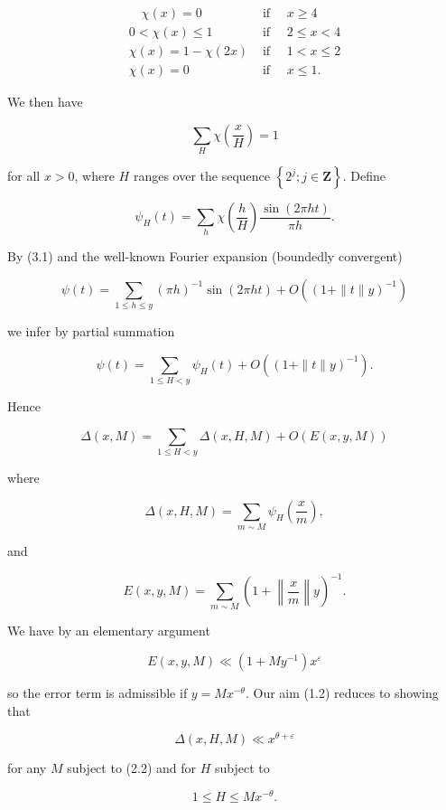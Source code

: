 \documentclass[10pt]{article}
\begin{document}
$$
\begin{aligned}
\quad \chi(x)=0 & \text { if } \quad x \geqslant 4 \\
0<\chi(x) \leqslant 1 & \text { if } \quad 2 \leqslant x<4 \\
\chi(x)=1-\chi(2 x) & \text { if } \quad 1<x \leqslant 2 \\
\chi(x)=0 & \text { if } \quad x \leqslant 1 .
\end{aligned}
$$

We then have


\begin{equation*}
\sum_{H} \chi\left(\frac{x}{H}\right)=1 \tag{3.1}
\end{equation*}


for all $x>0$, where $H$ ranges over the sequence $\left\{2^{j} ; j \in \mathbf{Z}\right\}$. Define

$$
\psi_{H}(t)=\sum_{h} \chi\left(\frac{h}{H}\right) \frac{\sin (2 \pi h t)}{\pi h} .
$$

By (3.1) and the well-known Fourier expansion (boundedly convergent)

$$
\psi(t)=\sum_{1 \leqslant h \leqslant y}(\pi h)^{-1} \sin (2 \pi h t)+O\left((1+\|t\| y)^{-1}\right)
$$

we infer by partial summation

$$
\psi(t)=\sum_{1 \leqslant H<y} \psi_{H}(t)+O\left((1+\|t\| y)^{-1}\right) .
$$

Hence

$$
\Delta(x, M)=\sum_{1 \leqslant H<y} \Delta(x, H, M)+O(E(x, y, M))
$$

where

$$
\Delta(x, H, M)=\sum_{m \sim M} \psi_{H}\left(\frac{x}{m}\right),
$$

and

$$
E(x, y, M)=\sum_{m \sim M}\left(1+\left\|\frac{x}{m}\right\| y\right)^{-1} .
$$

We have by an elementary argument

$$
E(x,y,M)\ll\left(1+My^{-1}\right)x^{\varepsilon}
$$

so the error term is admissible if $y=M x^{-\theta}$. Our aim (1.2) reduces to showing that


\begin{equation*}
\Delta(x, H, M) \ll x^{\theta+\varepsilon} \tag{3.2}
\end{equation*}


for any $M$ subject to (2.2) and for $H$ subject to


\begin{equation*}
1 \leqslant H \leqslant M x^{-\theta} . \tag{3.3}
\end{equation*}
\end{document}
